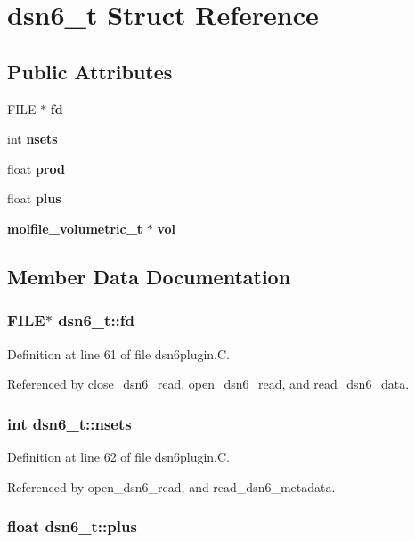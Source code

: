 \section{dsn6\_\-t  Struct Reference}
\label{structdsn6__t}
\subsection*{Public Attributes}
\begin{CompactItemize}
\item 
FILE $\ast$ {\bf fd}
\item 
int {\bf nsets}
\item 
float {\bf prod}
\item 
float {\bf plus}
\item 
{\bf molfile\_\-volumetric\_\-t} $\ast$ {\bf vol}
\end{CompactItemize}


\subsection{Member Data Documentation}
\subsubsection{\setlength{\rightskip}{0pt plus 5cm}FILE$\ast$ dsn6\_\-t::fd}\label{structdsn6__t_m0}




Definition at line 61 of file dsn6plugin.C.

Referenced by close\_\-dsn6\_\-read, open\_\-dsn6\_\-read, and read\_\-dsn6\_\-data.
\subsubsection{\setlength{\rightskip}{0pt plus 5cm}int dsn6\_\-t::nsets}\label{structdsn6__t_m1}




Definition at line 62 of file dsn6plugin.C.

Referenced by open\_\-dsn6\_\-read, and read\_\-dsn6\_\-metadata.
\subsubsection{\setlength{\rightskip}{0pt plus 5cm}float dsn6\_\-t::plus}\label{structdsn6__t_m3}




